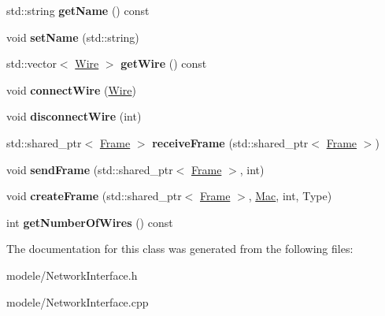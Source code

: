 \begin{DoxyCompactItemize}
\item 
\hypertarget{class_network_interface_aca6759254dc844a2af3d9f94ae0a515e}{std\-::string {\bfseries get\-Name} () const }\label{class_network_interface_aca6759254dc844a2af3d9f94ae0a515e}

\item 
\hypertarget{class_network_interface_a2c803cb05439d54c1e97a440cd5c4ec0}{void {\bfseries set\-Name} (std\-::string)}\label{class_network_interface_a2c803cb05439d54c1e97a440cd5c4ec0}

\item 
\hypertarget{class_network_interface_a5d0586aca632f2242c111e10d0a54115}{std\-::vector$<$ \hyperlink{class_wire}{Wire} $>$ {\bfseries get\-Wire} () const }\label{class_network_interface_a5d0586aca632f2242c111e10d0a54115}

\item 
\hypertarget{class_network_interface_a89681c2d2761e91b9807d85e79f06720}{void {\bfseries connect\-Wire} (\hyperlink{class_wire}{Wire})}\label{class_network_interface_a89681c2d2761e91b9807d85e79f06720}

\item 
\hypertarget{class_network_interface_a73b209b55dacd3267c7d92a321374ea3}{void {\bfseries disconnect\-Wire} (int)}\label{class_network_interface_a73b209b55dacd3267c7d92a321374ea3}

\item 
\hypertarget{class_network_interface_a743c4f8a9993db9a38c9fec699ab910a}{std\-::shared\-\_\-ptr$<$ \hyperlink{class_frame}{Frame} $>$ {\bfseries receive\-Frame} (std\-::shared\-\_\-ptr$<$ \hyperlink{class_frame}{Frame} $>$)}\label{class_network_interface_a743c4f8a9993db9a38c9fec699ab910a}

\item 
\hypertarget{class_network_interface_a6126d5a3377c94fcde4b96649811afb6}{void {\bfseries send\-Frame} (std\-::shared\-\_\-ptr$<$ \hyperlink{class_frame}{Frame} $>$, int)}\label{class_network_interface_a6126d5a3377c94fcde4b96649811afb6}

\item 
\hypertarget{class_network_interface_aec76f056f3265df81ed37847b0dba2f8}{void {\bfseries create\-Frame} (std\-::shared\-\_\-ptr$<$ \hyperlink{class_frame}{Frame} $>$, \hyperlink{class_mac}{Mac}, int, Type)}\label{class_network_interface_aec76f056f3265df81ed37847b0dba2f8}

\item 
\hypertarget{class_network_interface_ab18b497200411a7822a53d833dc2f589}{int {\bfseries get\-Number\-Of\-Wires} () const }\label{class_network_interface_ab18b497200411a7822a53d833dc2f589}

\end{DoxyCompactItemize}


The documentation for this class was generated from the following files\-:\begin{DoxyCompactItemize}
\item 
modele/Network\-Interface.\-h\item 
modele/Network\-Interface.\-cpp\end{DoxyCompactItemize}
